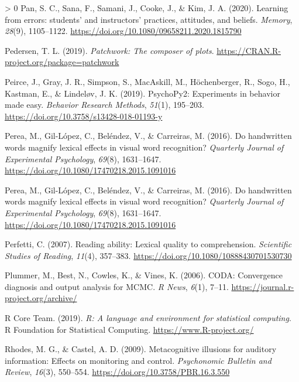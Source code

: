 \documentclass[
  english,
  jou]{apa7}
\newlength{\cslhangindent}
\newenvironment{CSLReferences}[3] %
 {%
  \setlength{\parindent}{0pt}
  \ifodd #1 \everypar{\setlength{\hangindent}{\cslhangindent}}\ignorespaces\fi
  \ifnum #2 > 0
  \setlength{\parskip}{#2\baselineskip}
  \fi
 }%
 {}
\begin{document}
\begin{CSLReferences}{1}{0}
\leavevmode\hypertarget{ref-Pan2020}{}%
Pan, S. C., Sana, F., Samani, J., Cooke, J., \& Kim, J. A. (2020). {Learning from errors: students' and instructors' practices, attitudes, and beliefs}. \emph{Memory}, \emph{28}(9), 1105--1122. \url{https://doi.org/10.1080/09658211.2020.1815790}

\leavevmode\hypertarget{ref-R-patchwork}{}%
Pedersen, T. L. (2019). \emph{Patchwork: The composer of plots}. \url{https://CRAN.R-project.org/package=patchwork}

\leavevmode\hypertarget{ref-Peirce2019}{}%
Peirce, J., Gray, J. R., Simpson, S., MacAskill, M., Höchenberger, R., Sogo, H., Kastman, E., \& Lindeløv, J. K. (2019). {PsychoPy2: Experiments in behavior made easy}. \emph{Behavior Research Methods}, \emph{51}(1), 195--203. \url{https://doi.org/10.3758/s13428-018-01193-y}

\leavevmode\hypertarget{ref-Perea2016}{}%
Perea, M., Gil-López, C., Beléndez, V., \& Carreiras, M. (2016). {Do handwritten words magnify lexical effects in visual word recognition?} \emph{Quarterly Journal of Experimental Psychology}, \emph{69}(8), 1631--1647. \url{https://doi.org/10.1080/17470218.2015.1091016}

\leavevmode\hypertarget{ref-Perea2016}{}%
Perea, M., Gil-López, C., Beléndez, V., \& Carreiras, M. (2016). {Do handwritten words magnify lexical effects in visual word recognition?} \emph{Quarterly Journal of Experimental Psychology}, \emph{69}(8), 1631--1647. \url{https://doi.org/10.1080/17470218.2015.1091016}

\leavevmode\hypertarget{ref-Perfetti2007}{}%
Perfetti, C. (2007). {Reading ability: Lexical quality to comprehension}. \emph{Scientific Studies of Reading}, \emph{11}(4), 357--383. \url{https://doi.org/10.1080/10888430701530730}

\leavevmode\hypertarget{ref-R-coda}{}%
Plummer, M., Best, N., Cowles, K., \& Vines, K. (2006). CODA: Convergence diagnosis and output analysis for MCMC. \emph{R News}, \emph{6}(1), 7--11. \url{https://journal.r-project.org/archive/}

\leavevmode\hypertarget{ref-R-base}{}%
R Core Team. (2019). \emph{R: A language and environment for statistical computing}. R Foundation for Statistical Computing. \url{https://www.R-project.org/}

\leavevmode\hypertarget{ref-Rhodes2009}{}%
Rhodes, M. G., \& Castel, A. D. (2009). {Metacognitive illusions for auditory information: Effects on monitoring and control}. \emph{Psychonomic Bulletin and Review}, \emph{16}(3), 550--554. \url{https://doi.org/10.3758/PBR.16.3.550}


\end{CSLReferences}
\end{document}
